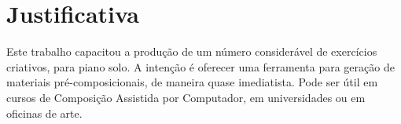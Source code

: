 \section{Justificativa}\label{sec:justificativa}

Este trabalho capacitou a produção de um número considerável de exercícios criativos, para piano solo. A intenção é oferecer uma ferramenta para geração de materiais pré-composicionais, de maneira quase imediatista. Pode ser útil em cursos de Composição Assistida por Computador, em universidades ou em oficinas de arte. 